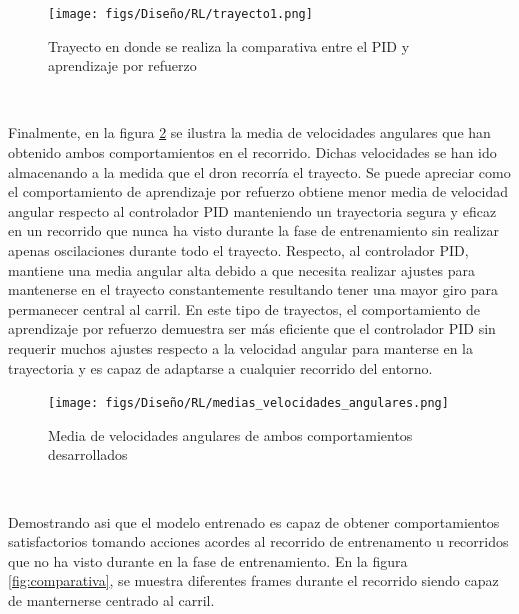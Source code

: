 \begin{figure} [H]
  \begin{center}
    \texttt{[image: figs/Diseño/RL/trayecto1.png]}
  \end{center}
  \caption{Trayecto en donde se realiza la comparativa entre el PID y aprendizaje por refuerzo}
  \label{fig:trayectoPID}
\end{figure}\

Finalmente, en la figura \ref{fig:media_velocidades} se ilustra la media de velocidades angulares que han obtenido ambos comportamientos en el recorrido. Dichas velocidades
se han ido almacenando a la medida que el dron recorría el trayecto. Se puede apreciar como el comportamiento de aprendizaje por refuerzo obtiene menor media de velocidad angular respecto al controlador PID manteniendo un trayectoria segura y eficaz en un recorrido 
que nunca ha visto durante la fase de entrenamiento sin realizar apenas oscilaciones durante todo el trayecto. Respecto, al controlador PID, mantiene una media angular alta debido a que 
necesita realizar ajustes para mantenerse en el trayecto constantemente resultando tener una mayor giro para permanecer central al carril. \newline
En este tipo de trayectos, el comportamiento de aprendizaje por refuerzo demuestra ser más eficiente que el controlador PID sin requerir muchos ajustes respecto a la velocidad
angular para manterse en la trayectoria y es capaz de adaptarse a cualquier recorrido del entorno.

\begin{figure} [H]
  \begin{center}
    \texttt{[image: figs/Diseño/RL/medias\_velocidades\_angulares.png]}
  \end{center}
  \caption{Media de velocidades angulares de ambos comportamientos desarrollados}
  \label{fig:media_velocidades}
\end{figure}\

Demostrando asi que el modelo entrenado es capaz de obtener comportamientos satisfactorios tomando acciones acordes
al recorrido de entrenamento u recorridos que no ha visto durante en la fase de entrenamiento. En la figura \ref{fig:comparativa}, se muestra diferentes frames 
durante el recorrido siendo capaz de manternerse centrado al carril. 

